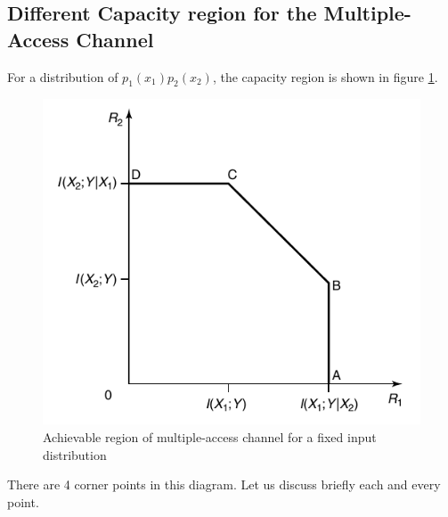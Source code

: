 \subsection{Different Capacity region for the Multiple-Access Channel}
For a distribution of $p_1(x_1)p_2(x_2)$, the capacity region is shown in figure \ref{fig:MAC}.\\
%
\begin{figure}[h]
    \centering
    \includegraphics[scale=0.35]{Diagrams/Achievable region of MAC.png}
    \caption{Achievable region of multiple-access channel for a fixed input distribution}
    \label{fig:MAC}
\end{figure}
%
\linebreak There are 4 corner points in this diagram. Let us discuss briefly each and every point. 
%
